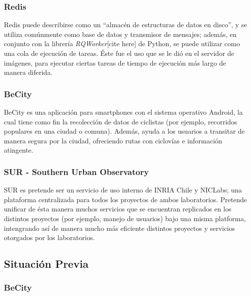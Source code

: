 \documentclass[11pt,letterpaper]{article}
\begin{document}
\subsubsection{Redis}

Redis puede describirse como un ``almacén de estructuras de datos en disco'', y se utiliza comúnmente como base de datos y transmisor de mensajes; además, en conjunto con la librería \emph{RQWorker}[cite here] de Python, se puede utilizar como una cola de ejecución de tareas. Éste fue el uso que se le dió en el servidor de imágenes, para ejecutar ciertas tareas de tiempo de ejecución más largo de manera diferida.

\subsubsection{BeCity}

BeCity es una aplicación para smartphones con el sistema operativo Android, la cual tiene como fin la recolección de datos de ciclistas (por ejemplo, recorridos populares en una ciudad o comuna). Además, ayuda a los usuarios a transitar de manera segura por la ciudad, ofreciendo rutas con ciclovías e información atingente.

\subsubsection{SUR - Southern Urban Observatory}

SUR es pretende ser un servicio de uso interno de INRIA Chile y NICLabs; una plataforma centralizada para todos los proyectos de ambos laboratorios. Pretende unificar de ésta manera muchos servicios que se encuentran replicados en los distintos proyectos (por ejemplo, manejo de usuarios) bajo una misma platforma, intengrando así de manera mucho más eficiente distintos proyectos y servicios otorgados por los laboratorios.

\subsection{Situación Previa}
\subsubsection{BeCity}
\end{document}
